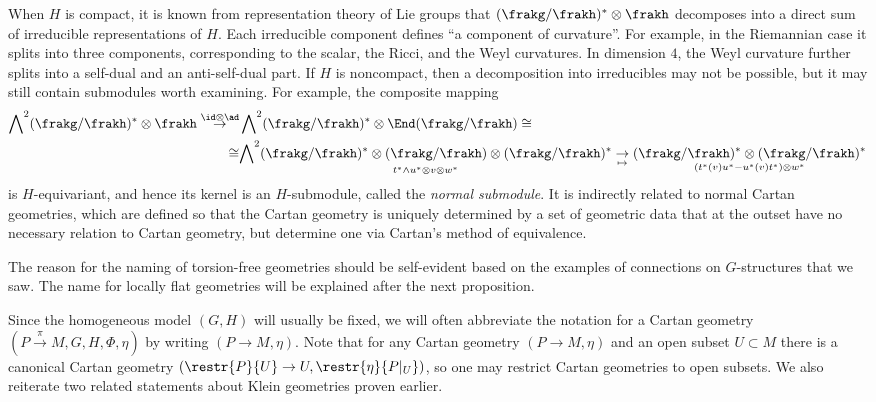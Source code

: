 \begin{example}
    When $H$ is compact, it is known from representation theory of Lie groups that $(\frakg\slash\frakh)^\ast\otimes\frakh$ decomposes into a direct sum of irreducible representations of $H$. Each irreducible component defines ``a component of curvature''. For example, in the Riemannian case it splits into three components, corresponding to the scalar, the Ricci, and the Weyl curvatures. In dimension $4$, the Weyl curvature further splits into a self-dual and an anti-self-dual part. If $H$ is noncompact, then a decomposition into irreducibles may not be possible, but it may still contain submodules worth examining. For example, the composite mapping 
    \begin{align}
        \bigwedge\nolimits^2(\frakg\slash\frakh)^\ast\otimes\frakh\overset{\id\otimes \ad}{\to}&\bigwedge\nolimits^2(\frakg\slash\frakh)^\ast\otimes\End(\frakg\slash\frakh)\cong \notag\\
        \cong &\underset{t^\ast\wedge u^\ast\otimes v\otimes w^\ast}{\bigwedge\nolimits^2(\frakg\slash\frakh)^\ast\otimes(\frakg\slash\frakh)\otimes (\frakg\slash\frakh)^\ast}
        \underset{\mapsto}{\to} \underset{(t^\ast(v)u^\ast-u^\ast(v)t^\ast)\otimes w^\ast}{(\frakg\slash\frakh)^\ast\otimes (\frakg\slash\frakh)^\ast}
    \end{align}
    is $H$-equivariant, and hence its kernel is an $H$-submodule, called the \emph{normal submodule}. It is indirectly related to normal Cartan geometries, which are defined so that the Cartan geometry is uniquely determined by a set of geometric data that at the outset have no necessary relation to Cartan geometry, but determine one via Cartan's method of equivalence.
\end{example}

The reason for the naming of torsion-free geometries should be self-evident based on the examples of connections on $G$-structures that we saw. The name for locally flat geometries will be explained after the next proposition.

Since the homogeneous model $(G,H)$ will usually be fixed, we will often abbreviate the notation for a Cartan geometry $(P\overset{\pi}{\to} M,G,H,\Phi,\eta)$ by writing $(P\to M,\eta)$. Note that for any Cartan geometry $(P\to M,\eta)$ and an open subset $U\subset M$ there is a canonical Cartan geometry $\left(\restr{P}{U}\to U,\restr{\eta}{P|_U}\right)$, so one may restrict Cartan geometries to open subsets. We also reiterate two related statements about Klein geometries proven earlier.

